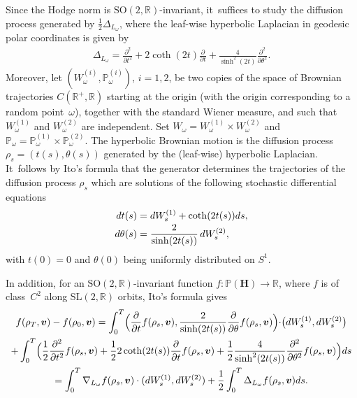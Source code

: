 \documentclass[10pt]{amsart}
\theoremstyle{plain}
\theoremstyle{definition}
\numberwithin{equation}{subsection}
\newcommand\bP{\mathbb{P}}
\newcommand\bR{\mathbb{R}}\let\R\bR
\newcommand{\SL}{\mathrm{SL}}
\newcommand{\SO}{\mathrm{SO}}
\let\gradient\nabla
\let\laplacian\Delta
\newcommand{\bfH}{\boldsymbol{H}}
\newcommand{\bfv}{\boldsymbol{v}}
\begin{document}
Since the Hodge norm is $\SO(2,\bR)$-invariant, it~suffices to study the diffusion process generated by $\frac{1}{2}\laplacian_{L_\omega}$, where the leaf-wise hyperbolic Laplacian in geodesic polar coordinates is given by
\begin{align}\laplacian_{L_\omega} = \frac{\partial^2}{\partial t^2} + 2\coth(2t)\frac{\partial}{\partial t}+\frac{4}{\sinh^2(2t)}\frac{\partial^2}{\partial \theta^2}.
\end{align} Moreover, let $(W_\omega^{(i)},\bP_\omega^{(i)})$, $i =1, 2$, be two copies of the space of Brownian trajectories $C(\bR^{+},\bR)$ starting at the origin (with the origin corresponding to a random point~$\omega$), together with the standard Wiener measure, and such that $W_\omega^{(1)}$ and $W_\omega^{(2)}$ are independent. Set $W_\omega = W_\omega^{(1)}\times W_\omega^{(2)}$ and $\bP_\omega = \bP_\omega^{(1)} \times \bP_\omega^{(2)}$. The hyperbolic Brownian motion is the diffusion process $\rho_s = (t(s),\theta (s))$ generated by the (leaf-wise) hyperbolic Laplacian. It~follows by Ito's formula \cite[Th.\,IV.3.3]{RY} that the generator determines the trajectories of the diffusion process $\rho_s$ which are solutions of the following stochastic differential equations\vspace*{-3pt}
\begin{align}
dt(s) &= dW_s^{(1)} + \coth(2t(s)) ds,\label{tsdef} \\[-2pt]
d\theta(s) &= \frac{2}{\sinh(2t(s))}\, dW_s^{(2)},\notag
\end{align}
with $t(0) = 0$ and $\theta(0)$ being uniformly distributed on $S^1$.

In addition, for an $\SO(2,\bR)$-invariant function $f : \bP(\bfH) \to \bR$, where $f$ is of class~$C^2$ along $\SL(2,\bR)$ orbits, Ito's formula gives\vspace*{-5pt}\enlargethispage{.5\baselineskip}
\begin{multline*}
f(\rho_T,\bfv) - f(\rho_0,\bfv) = \int_0^T \Bigl(\frac{\partial}{\partial t} f(\rho_s,\bfv),\frac{2}{\sinh(2t(s))} \frac{\partial}{\partial \theta} f(\rho_s,\bfv) \Bigl) \cdot \bigl(dW^{(1)}_s,dW^{(2)}_s\bigr) \\
+ \int_0^T \Bigl(\frac{1}{2}\frac{\partial^2 }{\partial t^2} f(\rho_s,\bfv) + \frac{1}{2}2\coth(2t(s))\frac{\partial}{\partial t} f(\rho_s,\bfv)+\frac{1}{2}\frac{4}{\sinh^2(2t(s))}\frac{\partial^2 }{\partial \theta^2} f(\rho_s,\bfv) \Bigr)ds \\
= \int_0^T \gradient_{L_\omega} f(\rho_s,\bfv) \cdot (dW^{(1)}_s,dW^{(2)}_s) + \frac{1}{2}\int_0^T \laplacian_{L_\omega} f(\rho_s,\bfv) ds.
\end{multline*}
\end{document}
